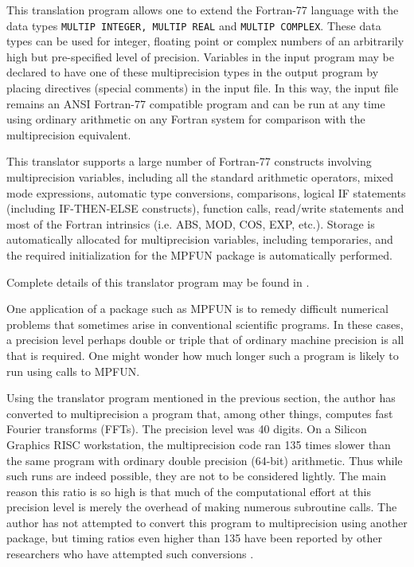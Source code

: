 This translation program allows one to extend the Fortran-77 language
with the data types {\tt MULTIP INTEGER, MULTIP REAL} and {\tt MULTIP
COMPLEX}.  These data types can be used for integer, floating point or
complex numbers of an arbitrarily high but pre-specified level of
precision.  Variables in the input program may be declared to have one
of these multiprecision types in the output program by placing
directives (special comments) in the input file.  In this way, the
input file remains an ANSI Fortran-77 compatible program and can be
run at any time using ordinary arithmetic on any Fortran system for
comparison with the multiprecision equivalent.

This translator supports a large number of Fortran-77 constructs
involving multiprecision variables, including all the standard
arithmetic operators, mixed mode expressions, automatic type
conversions, comparisons, logical IF statements (including
IF-THEN-ELSE constructs), function calls, read/write statements and
most of the Fortran intrinsics (i.e. ABS, MOD, COS, EXP, etc.).
Storage is automatically allocated for multiprecision variables,
including temporaries, and the required initialization for the MPFUN
package is automatically performed.

Complete details of this translator program may be found in
\cite{dhb1}.

\vspace{2ex}

One application of a package such as MPFUN is to remedy difficult
numerical problems that sometimes arise in conventional scientific
programs.  In these cases, a precision level perhaps double or triple
that of ordinary machine precision is all that is required.  One might
wonder how much longer such a program is likely to run using calls to
MPFUN.

Using the translator program mentioned in the previous section, the
author has converted to multiprecision a program that, among other
things, computes fast Fourier transforms (FFTs).  The precision level
was 40 digits.  On a Silicon Graphics RISC workstation, the
multiprecision code ran 135 times slower than the same program with
ordinary double precision (64-bit) arithmetic.  Thus while such runs
are indeed possible, they are not to be considered lightly.  The main
reason this ratio is so high is that much of the computational effort
at this precision level is merely the overhead of making numerous
subroutine calls.  The author has not attempted to convert this
program to multiprecision using another package, but timing ratios
even higher than 135 have been reported by other researchers who have
attempted such conversions \cite{kahan}.

